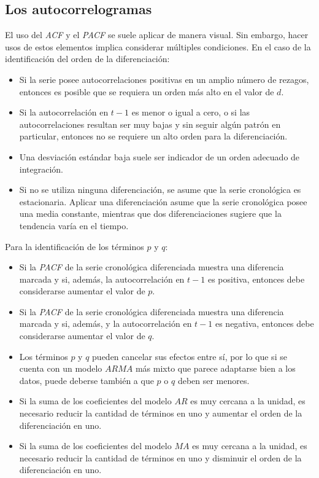 \documentclass[
]{article}
\providecommand{\tightlist}{%
  \setlength{\itemsep}{0pt}\setlength{\parskip}{0pt}}
\begin{document}
\subsection{Los autocorrelogramas}

El uso del \emph{ACF} y el \emph{PACF} se suele aplicar de manera
visual. Sin embargo, hacer usos de estos elementos implica considerar
múltiples condiciones. En el caso de la identificación del orden de la
diferenciación:

\begin{itemize}
\tightlist
\item
  Si la serie posee autocorrelaciones positivas en un amplio número de
  rezagos, entonces es posible que se requiera un orden más alto en el
  valor de \(d\).
\item
  Si la autocorrelación en \(t-1\) es menor o igual a cero, o si las
  autocorrelaciones resultan ser muy bajas y sin seguir algún patrón en
  particular, entonces no se requiere un alto orden para la
  diferenciación.
\item
  Una desviación estándar baja suele ser indicador de un orden adecuado
  de integración.
\item
  Si no se utiliza ninguna diferenciación, se asume que la serie
  cronológica es estacionaria. Aplicar una diferenciación asume que la
  serie cronológica posee una media constante, mientras que dos
  diferenciaciones sugiere que la tendencia varía en el tiempo.
\end{itemize}

Para la identificación de los términos \(p\) y \(q\):

\begin{itemize}
\tightlist
\item
  Si la \emph{PACF} de la serie cronológica diferenciada muestra una
  diferencia marcada y si, además, la autocorrelación en \(t-1\) es
  positiva, entonces debe considerarse aumentar el valor de \(p\).
\item
  Si la \emph{PACF} de la serie cronológica diferenciada muestra una
  diferencia marcada y si, además, y la autocorrelación en \(t-1\) es
  negativa, entonces debe considerarse aumentar el valor de \(q\).
\item
  Los términos \(p\) y \(q\) pueden cancelar sus efectos entre sí, por
  lo que si se cuenta con un modelo \(ARMA\) más mixto que parece
  adaptarse bien a los datos, puede deberse también a que \(p\) o \(q\)
  deben ser menores.
\item
  Si la suma de los coeficientes del modelo \(AR\) es muy cercana a la
  unidad, es necesario reducir la cantidad de términos en uno y aumentar
  el orden de la diferenciación en uno.
\item
  Si la suma de los coeficientes del modelo \(MA\) es muy cercana a la
  unidad, es necesario reducir la cantidad de términos en uno y
  disminuir el orden de la diferenciación en uno.
\end{itemize}
\end{document}
